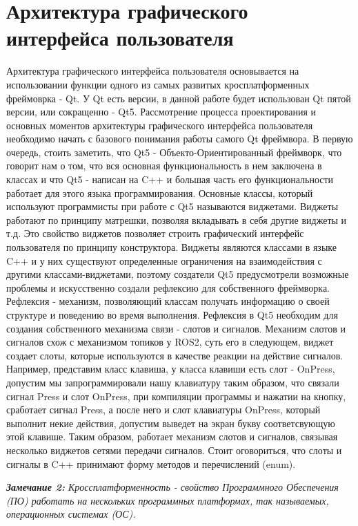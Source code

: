 \documentclass[a4paper, 14pt]{extreport}
\begin{document}
\section{Архитектура графического интерфейса пользователя}
\par Архитектура графического интерфейса пользователя основывается на использовании функции одного из самых развитых кросплатформенных
фреймоврка - Qt. У Qt есть версии, в данной работе будет использован Qt пятой версии, или сокращенно - Qt5. Рассмотрение процесса 
проектирования и основных моментов архитектуры графического интерфейса пользователя необходимо начать с базового понимания работы самого
Qt фреймвора. В первую очередь, стоить заметить, что Qt5 - Объекто-Ориентированный фреймворк, что говорит нам о том, что вся основная 
функциональность в нем заключена в классах и что Qt5 - написан на C++ и большая часть его функциональности работает для этого языка 
программирования. Основные классы, который используют программисты при работе с Qt5 называются виджетами. Виджеты работают по принципу 
матрешки, позволяя вкладывать в себя другие виджеты и т.д. Это свойство виджетов позволяет строить графический интерфейс пользователя 
по принципу конструктора. Виджеты являются классами в языке C++ и у них существуют определенные ограничения на взаимодействия с другими 
классами-виджетами, поэтому создатели Qt5 предусмотрели возможные проблемы и искусственно создали рефлексию\cite{reflectArt} для собственного фреймворка.
Рефлексия - механизм, позволяющий классам получать информацию о своей структуре и поведению во время выполнения. Рефлексия в Qt5 необходим 
для создания собственного механизма связи - слотов и сигналов. Механизм слотов и сигналов схож с механизмом топиков у ROS2, суть его в 
следующем, виджет создает слоты, которые используются в качестве реакции на действие сигналов. Например, представим класс клавиша, 
у класса клавиши есть слот - OnPress, допустим мы запрограммировали нашу клавиатуру таким образом, что связали сигнал Press и 
слот OnPress, при компиляции программы и нажатии на кнопку, сработает сигнал Press, а после него и слот клавиатуры OnPress, который 
выполнит некие действия, допустим выведет на экран букву соответсвующую этой клавише. Таким образом, работает механизм слотов и сигналов,
связывая несколько виджетов сетями передачи сигналов. Стоит оговориться, что слоты и сигналы в C++ принимают форму методов и перечислений
(enum).
\par\noindent \textsl{\textbf{Замечание 2:} Кроссплатформенность - свойство Программного Обеспечения (ПО) работать на нескольких программных 
платформах, так называемых, операционных системах (ОС).}
\end{document}
